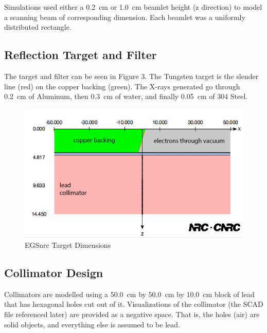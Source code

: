 \documentclass[12pt]{article}
\begin{document}
Simulations used either a \SI{0.2}{\cm} or \SI{1.0}{\cm} beamlet height (z direction) to model a scanning beam of corresponding dimension. Each beamlet was a uniformly distributed rectangle.

\subsection*{Reflection Target and Filter}
The target and filter can be seen in Figure 3. The Tungsten target is the slender line (red) on the copper backing (green). The X-rays generated go through \SI{0.2}{\cm} of Aluminum, then \SI{0.3}{\cm} of water, and finally \SI{0.05}{\cm} of 304 Steel.

\begin{figure}[H]
\centering
\includegraphics[scale=0.3]{../egs-geometry.png}
\caption{EGSnrc Target Dimensions}
\end{figure}

\subsection*{Collimator Design}
Collimators are modelled using a \SI{50.0}{\cm} by \SI{50.0}{\cm} by \SI{10.0}{\cm} block of lead that has hexagonal holes cut out of it. Visualizations of the collimator (the SCAD file referenced later) are provided as a negative space. That is, the holes (air) are solid objects, and everything else is assumed to be lead.
\end{document}
